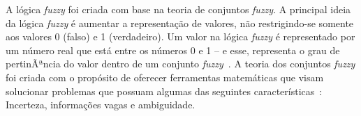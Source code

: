 \documentclass[12pt]{article}
\begin{document}
A lógica \textit{fuzzy} foi criada com base na teoria de conjuntos \textit{fuzzy}. A principal ideia da lógica \textit{fuzzy} é aumentar a representação de valores, não restrigindo-se somente aos valores 0 (falso) e 1 (verdadeiro). Um valor na lógica \textit{fuzzy} é representado por um número real que está entre os números 0 e 1 -- e esse, representa o grau de pertinÃªncia do valor dentro de um conjunto \textit{fuzzy}~\cite{boclin:06}. A teoria dos conjuntos \textit{fuzzy} foi criada com o propósito de oferecer ferramentas matemáticas que visam solucionar problemas que possuam algumas das seguintes características~\cite{falcao:02}: Incerteza, informações vagas e ambiguidade.

\end{document}
